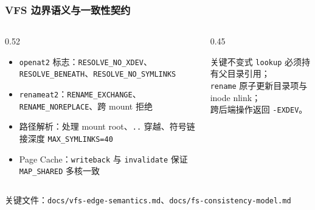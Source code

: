 \documentclass[aspectratio=1610]{beamer}
\newcommand{\code}[1]{\texttt{\footnotesize #1}}
\begin{document}
\begin{frame}
    \frametitle{VFS 边界语义与一致性契约}
    \begin{columns}
        \begin{column}{0.52\textwidth}
            \footnotesize
            \begin{itemize}
                \item \code{openat2} 标志：\code{RESOLVE\_NO\_XDEV}、\code{RESOLVE\_BENEATH}、\code{RESOLVE\_NO\_SYMLINKS}
                \item \code{renameat2}：\code{RENAME\_EXCHANGE}、\code{RENAME\_NOREPLACE}、跨 mount 拒绝
                \item 路径解析：处理 mount root、\code{..} 穿越、符号链接深度 \code{MAX\_SYMLINKS=40}
                \item Page Cache：\code{writeback} 与 \code{invalidate} 保证 \code{MAP\_SHARED} 多核一致
            \end{itemize}
        \end{column}
        \begin{column}{0.45\textwidth}
            \footnotesize
            \begin{block}{关键不变式}
                \code{lookup} 必须持有父目录引用；\\
                \code{rename} 原子更新目录项与 inode nlink；\\
                跨后端操作返回 \code{-EXDEV}。
            \end{block}
        \end{column}
    \end{columns}
    \vspace{0.3em}
    \small 关键文件：\code{docs/vfs-edge-semantics.md}、\code{docs/fs-consistency-model.md}
\end{frame}
\end{document}
